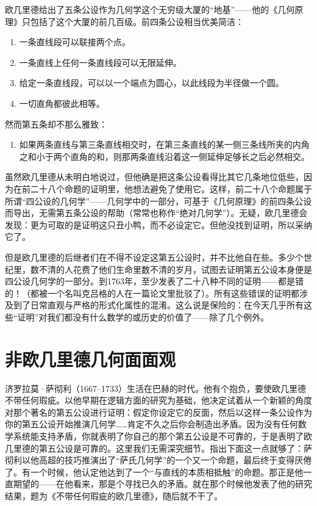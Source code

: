 欧几里德给出了五条公设作为几何学这个无穷级大厦的“地基”——他的《几何原理》只包括了这个大厦的前几百级。前四条公设相当优美简洁：
\begin{enumerate}
\item 一条直线段可以联接两个点。
\item 一条直线上任何一条直线段可以无限延伸。
\item 给定一条直线段，可以以一个端点为圆心，以此线段为半径做一个圆。
\item 一切直角都彼此相等。
\end{enumerate}
然而第五条却不那么雅致：
\begin{enumerate}[resume]
\item 如果两条直线与第三条直线相交时，在第三条直线的某一侧三条线所夹的内角之和小于两个直角的和，则那两条直线沿着这一侧延伸足够长之后必然相交。
\end{enumerate}

虽然欧几里德从未明白地说过，但他确是把这条公设看得比其它几条地位低些，因为在前二十八个命题的证明里，他想法避免了使用它。这样，前二十八个命题属于所谓“四公设的几何学”——几何学中的一部分，可基于《几何原理》的前四条公设而导出，无需第五条公设的帮助（常常也称作“绝对几何学”）。无疑，欧几里德会发现：更为可取的是证明这只丑小鸭，而不必设定它。但他没找到证明，所以采纳它了。

但是欧几里德的后继者们在不得不设定这第五公设时，并不比他自在些。多少个世纪里，数不清的人花费了他们生命里数不清的岁月，试图去证明第五公设本身便是四公设几何学的一部分。到1763年，至少发表了二十八种不同的证明——都是错的！（都被一个名叫克吕格的人在一篇论文里批驳了）。所有这些错误的证明都涉及到了日常直观与严格的形式化属性的混淆。这么说是保险的：在今天几乎所有这些“证明”对我们都没有什么数学的或历史的价值了——除了几个例外。

\section{非欧几里德几何面面观}

济罗拉莫·萨彻利（1667--1733）生活在巴赫的时代。他有个抱负，要使欧几里德不带任何瑕疵。以他早期在逻辑方面的研究为基础，他决定试着从一个新颖的角度对那个著名的第五公设进行证明：假定你设定它的反面，然后以这样一条公设作为你的第五公设开始推演几何学……肯定不久之后你会制造出矛盾。因为没有任何数学系统能支持矛盾，你就表明了你自己的那个第五公设是不可靠的，于是表明了欧几里德的第五公设是可靠的。这里我们无需深究细节。指出下面这一点就够了：萨彻利以他高超的技巧推演出了“萨氏几何学”的一个又一个命题，最后终于变得厌倦了。有一个时候，他认定他达到了一个“与直线的本质相抵触”的命题。那正是他一直期望的——在他看来，那是个寻找已久的矛盾。就在那个时候他发表了他的研究结果，题为《不带任何瑕疵的欧几里德》，随后就不干了。

